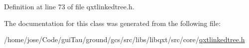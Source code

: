 Definition at line 73 of file qxtlinkedtree.\-h.



The documentation for this class was generated from the following file\-:\begin{DoxyCompactItemize}
\item 
/home/jose/\-Code/gui\-Tau/ground/gcs/src/libs/libqxt/src/core/\hyperlink{qxtlinkedtree_8h}{qxtlinkedtree.\-h}\end{DoxyCompactItemize}
